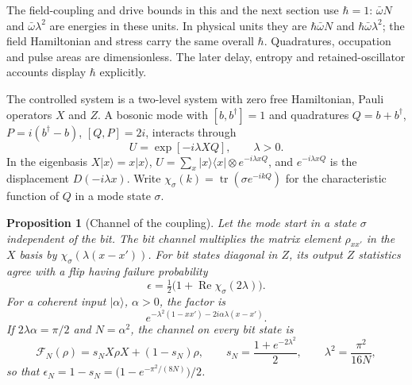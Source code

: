 \documentclass[aps,pre,onecolumn,superscriptaddress,floatfix,longbibliography]{revtex4-2}
\newtheorem{proposition}[theorem]{Proposition}
\begin{document}
The field-coupling and drive bounds in this and the next section use
$\hbar=1$: $\bar\omega N$ and $\bar\omega\lambda^2$ are energies in
these units. In physical units they are $\hbar\bar\omega N$ and
$\hbar\bar\omega\lambda^2$; the field Hamiltonian and stress carry
the same overall $\hbar$. Quadratures, occupation and pulse areas are
dimensionless. The later delay, entropy and retained-oscillator accounts
display $\hbar$ explicitly.

The controlled system is a two-level system with zero free Hamiltonian, Pauli operators $X$ and $Z$. A bosonic mode with $[b,b^\dagger]=1$ and quadratures $Q=b+b^\dagger$, $P=i(b^\dagger-b)$, $[Q,P]=2i$, interacts through
\begin{equation}
U=\exp[-i\lambda XQ],\qquad \lambda>0.
\label{eq:U}
\end{equation}
In the eigenbasis $X|x\rangle=x|x\rangle$, $U=\sum_x|x\rangle\langle x|\otimes e^{-i\lambda xQ}$, and $e^{-i\lambda xQ}$ is the displacement $D(-i\lambda x)$. Write $\chi_\sigma(k)=\operatorname{tr}(\sigma e^{-ikQ})$ for the characteristic function of $Q$ in a mode state $\sigma$.

\begin{proposition}[Channel of the coupling]
\label{prop:channel}
Let the mode start in a state $\sigma$ independent of the bit. The bit channel multiplies the matrix element $\rho_{xx'}$ in the $X$ basis by $\chi_\sigma(\lambda(x-x'))$. For bit states diagonal in $Z$, its output $Z$ statistics agree with a flip having failure probability
\begin{equation}
\epsilon=\tfrac12\bigl(1+\operatorname{Re}\chi_\sigma(2\lambda)\bigr).
\label{eq:eps-general}
\end{equation}
For a coherent input $|\alpha\rangle$, $\alpha>0$, the factor is
\begin{equation}
e^{-\lambda^2(1-xx')-2i\alpha\lambda(x-x')}.
\label{eq:coef}
\end{equation}
If $2\lambda\alpha=\pi/2$ and $N=\alpha^2$, the channel on every bit state is
\begin{equation}
\mathcal F_N(\rho)=s_NX\rho X+(1-s_N)\rho,\qquad
s_N=\frac{1+e^{-2\lambda^2}}2,\qquad \lambda^2=\frac{\pi^2}{16N},
\label{eq:FN}
\end{equation}
so that $\epsilon_N=1-s_N=\bigl(1-e^{-\pi^2/(8N)}\bigr)/2$.
\end{proposition}
\end{document}
